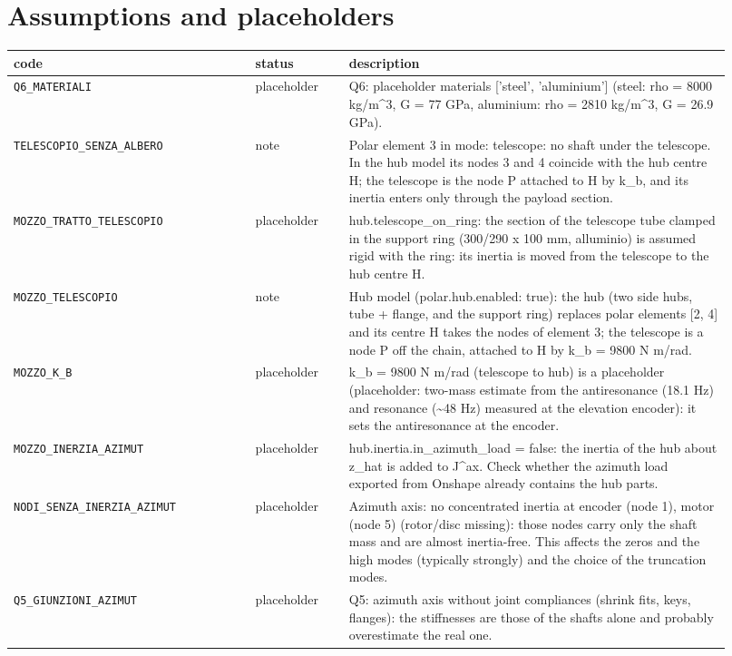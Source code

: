 \documentclass[10pt,a4paper]{article}
\numberwithin{equation}{section}
\begin{document}
\section{Assumptions and placeholders}\label{sec:assumptions}
\begin{longtable}{p{0.31\linewidth}p{0.12\linewidth}p{0.49\linewidth}}
\toprule code & status & description \\ \midrule\endhead
\texttt{Q6\_MATERIALI} & placeholder & Q6: placeholder materials ['steel', 'aluminium'] (steel: rho = 8000 kg/m\^{}3, G = 77 GPa, aluminium: rho = 2810 kg/m\^{}3, G = 26.9 GPa). \\
\texttt{TELESCOPIO\_SENZA\_ALBERO} & note & Polar element 3 in mode: telescope: no shaft under the telescope. In the hub model its nodes 3 and 4 coincide with the hub centre H; the telescope is the node P attached to H by k\_b, and its inertia enters only through the payload section. \\
\texttt{MOZZO\_TRATTO\_TELESCOPIO} & placeholder & hub.telescope\_on\_ring: the section of the telescope tube clamped in the support ring (300/290 x 100 mm, alluminio) is assumed rigid with the ring: its inertia is moved from the telescope to the hub centre H. \\
\texttt{MOZZO\_TELESCOPIO} & note & Hub model (polar.hub.enabled: true): the hub (two side hubs, tube + flange, and the support ring) replaces polar elements [2, 4] and its centre H takes the nodes of element 3; the telescope is a node P off the chain, attached to H by k\_b = 9800 N m/rad. \\
\texttt{MOZZO\_K\_B} & placeholder & k\_b = 9800 N m/rad (telescope to hub) is a placeholder (placeholder: two-mass estimate from the antiresonance (18.1 Hz) and resonance (\textasciitilde{}48 Hz) measured at the elevation encoder): it sets the antiresonance at the encoder. \\
\texttt{MOZZO\_INERZIA\_AZIMUT} & placeholder & hub.inertia.in\_azimuth\_load = false: the inertia of the hub about z\_hat is added to J\^{}ax. Check whether the azimuth load exported from Onshape already contains the hub parts. \\
\texttt{NODI\_SENZA\_INERZIA\_AZIMUT} & placeholder & Azimuth axis: no concentrated inertia at encoder (node 1), motor (node 5) (rotor/disc missing): those nodes carry only the shaft mass and are almost inertia-free. This affects the zeros and the high modes (typically strongly) and the choice of the truncation modes. \\
\texttt{Q5\_GIUNZIONI\_AZIMUT} & placeholder & Q5: azimuth axis without joint compliances (shrink fits, keys, flanges): the stiffnesses are those of the shafts alone and probably overestimate the real one. \\

\end{longtable}
\end{document}
